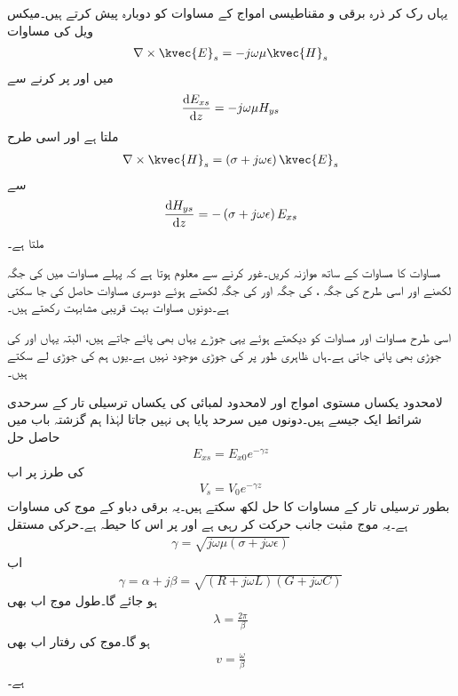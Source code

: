 یہاں رک کر ذرہ برقی و مقناطیسی امواج کے مساوات کو دوبارہ پیش کرتے ہیں۔میکس ویل کی مساوات
\begin{align*}
\nabla \times \kvec{E}_s=-j \omega \mu \kvec{H}_s
\end{align*}
میں  اور   پر کرنے سے
\begin{align}\label{مساوات_ترسیل_برقی_شدت_تفرقی_مساوات}
\frac{\dif E_{xs}}{\dif z}=-j \omega \mu H_{ys}
\end{align}
ملتا ہے اور اسی طرح
\begin{align*}
\nabla \times \kvec{H}_s=\left(\sigma+j\omega \epsilon \right)\kvec{E}_s
\end{align*}
سے
\begin{align}\label{مساوات_ترسیل_مقناطیسی_شدت_تفرقی_مساوات}
\frac{\dif H_{ys}}{\dif z}=-\left(\sigma+j \omega \epsilon \right) E_{xs}
\end{align}
ملتا ہے۔

مساوات  کا مساوات  کے ساتھ موازنہ کریں۔غور کرنے سے معلوم ہوتا ہے کہ پہلے مساوات میں  کی جگہ  لکھنے اور اسی طرح  کی جگہ ،  کی جگہ  اور  کی جگہ  لکھتے ہوئے دوسری مساوات حاصل کی جا سکتی ہے۔دونوں مساوات بہت قریبی مشابہت رکھتے ہیں۔

اسی طرح مساوات  اور مساوات  کو دیکھتے ہوئے  یہی جوڑے یہاں بھی پائے جاتے ہیں، البتہ یہاں  اور  کی جوڑی بھی پائی جاتی ہے۔ہاں ظاہری طور پر  کی جوڑی موجود نہیں ہے۔یوں ہم  کی جوڑی  لے سکتے ہیں۔

لامحدود یکساں مستوی امواج اور لامحدود لمبائی کی یکساں ترسیلی تار کے سرحدی شرائط ایک جیسے ہیں۔دونوں میں سرحد پایا ہی نہیں جاتا لہٰذا  ہم گزشتہ باب میں حاصل حل
\begin{align*}
E_{xs}=E_{x0} e^{- \gamma z}
\end{align*}
کی طرز پر اب
\begin{align}
V_s=V_0 e^{- \gamma z}
\end{align}
بطور ترسیلی تار کے مساوات کا حل لکھ سکتے ہیں۔یہ برقی دباو کے موج کی مساوات ہے۔یہ موج مثبت  جانب حرکت کر رہی ہے اور  پر اس کا حیطہ  ہے۔حرکی مستقل
\begin{align*}
\gamma=\sqrt{j \omega \mu (\sigma +j\omega \epsilon)}
\end{align*}
اب
\begin{align}
\gamma=\alpha+j\beta=\sqrt{(R+j\omega L)(G+j\omega C)}
\end{align}
ہو جائے گا۔طول موج اب بھی
\begin{align}
\lambda=\frac{2\pi}{\beta}
\end{align}
ہو گا۔موج کی رفتار اب بھی
\begin{align}
v=\frac{\omega}{\beta}
\end{align}
ہے۔

